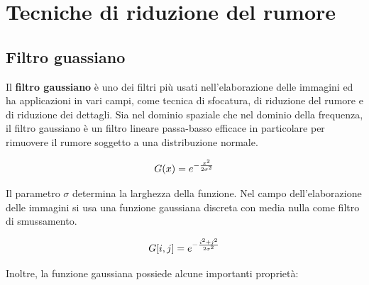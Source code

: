 \documentclass[../main.tex]{subfiles}
\begin{document}
\section{Tecniche di riduzione del rumore}

\subsection{Filtro guassiano}

Il \textbf{filtro gaussiano} è uno dei filtri più usati nell'elaborazione delle immagini ed ha applicazioni in vari campi, come tecnica di sfocatura, di riduzione del rumore e di riduzione dei dettagli. Sia nel dominio spaziale che nel dominio della frequenza, il filtro gaussiano è un filtro lineare passa-basso efficace in particolare per rimuovere il rumore soggetto a una distribuzione normale.

\begin{equation}
	G(x) = e^{\large-\frac{x^2}{2\sigma^2}}
\end{equation}

Il parametro $\sigma$ determina la larghezza della funzione. Nel campo dell'elaborazione delle immagini si usa una funzione gaussiana discreta con media nulla come filtro di smussamento.\cite{ito_2000}

\begin{equation}
	G[i,j] = e^{\large-\frac{i^2+j^2}{2\sigma^2}}
\end{equation}

Inoltre, la funzione gaussiana possiede alcune importanti proprietà: \cite{wang_2014,getreuer_2013}
\end{document}
